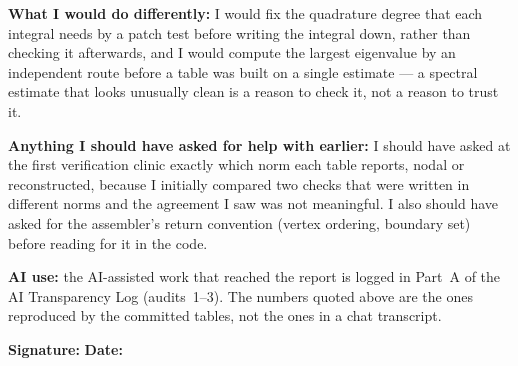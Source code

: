\documentclass[10pt]{article}
\begin{document}
\begin{formbox}
\textbf{What I would do differently:} I would fix the quadrature degree
that each integral needs by a patch test before writing the integral down,
rather than checking it afterwards, and I would compute the largest
eigenvalue by an independent route before a table was built on a single
estimate --- a spectral estimate that looks unusually clean is a reason to
check it, not a reason to trust it.

\textbf{Anything I should have asked for help with earlier:} I should have
asked at the first verification clinic exactly which norm each table
reports, nodal or reconstructed, because I initially compared two checks
that were written in different norms and the agreement I saw was not
meaningful. I also should have asked for the assembler's return convention
(vertex ordering, boundary set) before reading for it in the code.

\textbf{AI use:} the AI-assisted work that reached the report is logged in
Part~A of the AI Transparency Log (audits~1--3). The numbers quoted above
are the ones reproduced by the committed tables, not the ones in a chat
transcript.

\vfill
\textbf{Signature:} \underline{\hspace{4.5cm}} \hfill
\textbf{Date:} \underline{\hspace{2.5cm}}
\end{formbox}
\end{document}
